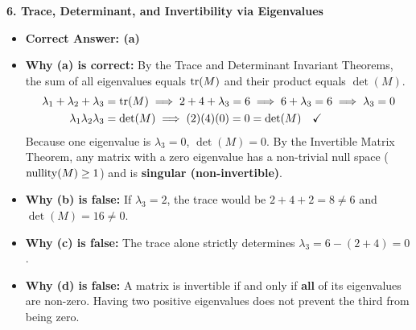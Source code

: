 \textbf{6. Trace, Determinant, and Invertibility via Eigenvalues}
\begin{itemize}
    \item \textbf{Correct Answer: (a)}
    \item \textbf{Why (a) is correct:} By the Trace and Determinant Invariant Theorems, the sum of all eigenvalues equals $\operatorname{tr}(M)$ and their product equals $\det(M)$.
    \begin{align*}
    \lambda_1 + \lambda_2 + \lambda_3 &= \operatorname{tr}(M) \implies 2 + 4 + \lambda_3 = 6 \implies 6 + \lambda_3 = 6 \implies \lambda_3 = 0 \\
    \lambda_1 \lambda_2 \lambda_3 &= \det(M) \implies (2)(4)(0) = 0 = \det(M) \quad \checkmark
    \end{align*}
    Because one eigenvalue is $\lambda_3 = 0$, $\det(M) = 0$. By the Invertible Matrix Theorem, any matrix with a zero eigenvalue has a non-trivial null space ($\operatorname{nullity}(M) \ge 1$) and is \textbf{singular (non-invertible)}.
    \item \textbf{Why (b) is false:} If $\lambda_3 = 2$, the trace would be $2 + 4 + 2 = 8 \neq 6$ and $\det(M) = 16 \neq 0$.
    \item \textbf{Why (c) is false:} The trace alone strictly determines $\lambda_3 = 6 - (2 + 4) = 0$.
    \item \textbf{Why (d) is false:} A matrix is invertible if and only if \textbf{all} of its eigenvalues are non-zero. Having two positive eigenvalues does not prevent the third from being zero.
\end{itemize}

